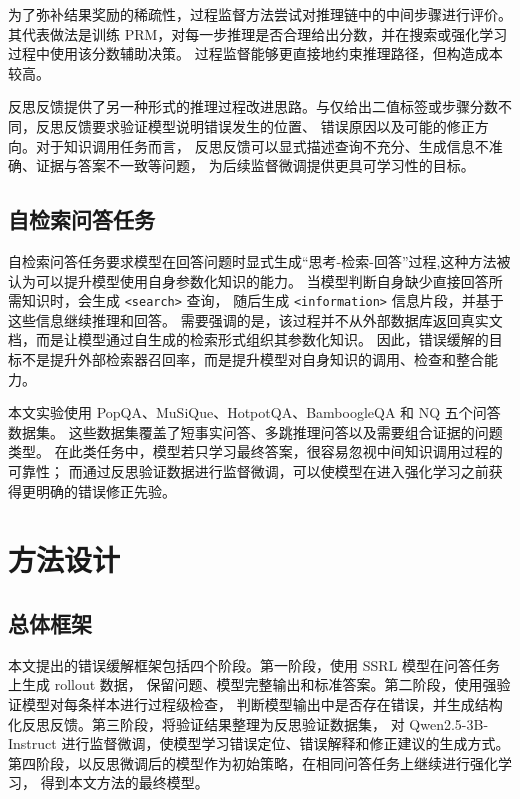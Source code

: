为了弥补结果奖励的稀疏性，过程监督方法尝试对推理链中的中间步骤进行评价。
其代表做法是训练 PRM，对每一步推理是否合理给出分数，并在搜索或强化学习过程中使用该分数辅助决策。
过程监督能够更直接地约束推理路径，但构造成本较高\cite{ref15_he2025large}。

反思反馈提供了另一种形式的推理过程改进思路。与仅给出二值标签或步骤分数不同，反思反馈要求验证模型说明错误发生的位置、
错误原因以及可能的修正方向。对于知识调用任务而言，
反思反馈可以显式描述查询不充分、生成信息不准确、证据与答案不一致等问题，
为后续监督微调提供更具可学习性的目标。

\subsection{自检索问答任务}

自检索问答任务要求模型在回答问题时显式生成“思考-检索-回答”过程,这种方法被认为可以提升模型使用自身参数化知识的能力\cite{fan2025ssrl}。
当模型判断自身缺少直接回答所需知识时，会生成 \verb|<search>| 查询，
随后生成 \verb|<information>| 信息片段，并基于这些信息继续推理和回答。
需要强调的是，该过程并不从外部数据库返回真实文档，而是让模型通过自生成的检索形式组织其参数化知识。
因此，错误缓解的目标不是提升外部检索器召回率，而是提升模型对自身知识的调用、检查和整合能力。

本文实验使用 PopQA、MuSiQue、HotpotQA、BamboogleQA 和 NQ 五个问答数据集。
这些数据集覆盖了短事实问答、多跳推理问答以及需要组合证据的问题类型。
在此类任务中，模型若只学习最终答案，很容易忽视中间知识调用过程的可靠性；
而通过反思验证数据进行监督微调，可以使模型在进入强化学习之前获得更明确的错误修正先验。

\section{方法设计}

\subsection{总体框架}

本文提出的错误缓解框架包括四个阶段。第一阶段，使用 SSRL 模型在问答任务上生成 rollout 数据，
保留问题、模型完整输出和标准答案。第二阶段，使用强验证模型对每条样本进行过程级检查，
判断模型输出中是否存在错误，并生成结构化反思反馈。第三阶段，将验证结果整理为反思验证数据集，
对 Qwen2.5-3B-Instruct 进行监督微调，使模型学习错误定位、错误解释和修正建议的生成方式。
第四阶段，以反思微调后的模型作为初始策略，在相同问答任务上继续进行强化学习，
得到本文方法的最终模型。

